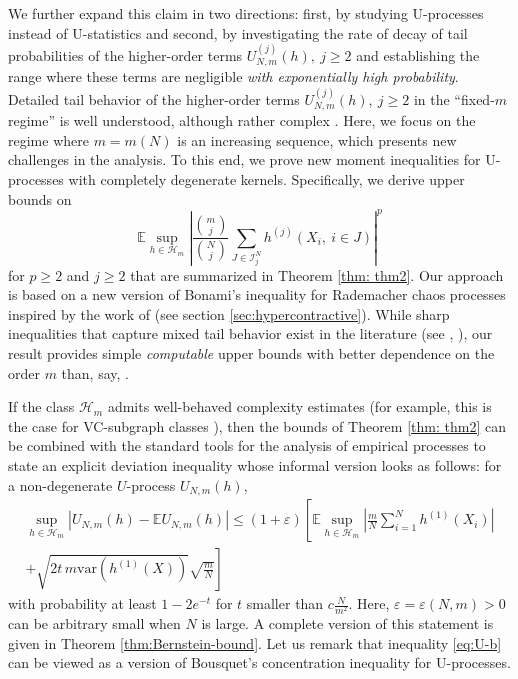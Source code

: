 \documentclass[12pt]{article}
\newcommand\var{\mathrm{var}}
\newcommand{\eps}{\varepsilon}
\def\l{\left}
\def\r{\right}
\newcommand{\m}{\mathcal}
\newcommand{\mb}{\mathbb}
\theoremstyle{thmstyletwo}%
\theoremstyle{thmstylethree}%
\begin{document}
We further expand this claim in two directions: first, by studying U-processes instead of U-statistics and second, by investigating the rate of decay of tail probabilities of the higher-order terms $U_{N,m}^{(j)}(h), \ j\geq 2$ and establishing the range where these terms are negligible \emph{with exponentially high probability}. 
Detailed tail behavior of the higher-order terms $U_{N,m}^{(j)}(h), \ j\geq 2$ in the ``fixed-$m$ regime'' is well understood, although rather complex \citep{adamczak2006moment,gine2000exponential}. Here, we focus on the regime where $m=m(N)$ is an increasing sequence, which presents new challenges in the analysis. 
To this end, we prove new moment inequalities for U-processes with completely degenerate kernels. Specifically, we derive upper bounds on 
\[
\mb E \sup_{h \in \mathcal{H}_m}\left\lvert \frac{{m \choose j}}{{N \choose j}} \sum_{J \in \mathcal{I}^N_j} h^{(j)}\l(X_i,\  i \in J\r)\right\rvert^p
\]
for \(p \ge 2\) and \(j \ge 2\) that are summarized in Theorem \ref{thm: thm2}. Our approach is based on a new version of Bonami's inequality for Rademacher chaos processes inspired by the work of \cite{dirksen2015tail} (see section \ref{sec:hypercontractive}). While sharp inequalities that capture mixed tail behavior exist in the literature (see \citep[Theorem 14]{boucheron2005moment}, \cite{adamczak2006moment}), our result provides simple \emph{computable} upper bounds with better dependence on the order $m$ than, say, \cite[Corollary 5]{boucheron2005moment}. 

If the class $\m H_m$ admits well-behaved complexity estimates (for example, this is the case for VC-subgraph classes \citep{wellner2013weak}), then the bounds of Theorem \ref{thm: thm2} can be combined with the standard tools for the analysis of empirical processes to state an explicit deviation inequality whose informal version looks as follows: for a non-degenerate $U$-process $U_{N,m}(h)$, 
\begin{multline}
\label{eq:U-b}
\sup_{h\in \m H_m} \l| U_{N,m}(h) - \mb E U_{N,m}(h) \r| 
    \leq (1+\eps)\l[\mb E\sup_{h\in \m H_m}\l|\frac{m}{N} \sum_{i=1}^N h^{(1)}\l(X_i\r)\r| \r.
    \\
    + \l. \sqrt{2t \,m\var\l(h^{(1)}(X)\r)}\sqrt{\frac{m}{N}} \r]
\end{multline}
with probability at least \(1-2e^{-t}\) for $t$ smaller than $c\frac{N}{m^2}$. 
Here, $\eps=\eps(N,m)>0$ can be arbitrary small when $N$ is large. 
A complete version of this statement is given in Theorem \ref{thm:Bernstein-bound}. Let us remark that inequality \eqref{eq:U-b} can be viewed as a version of Bousquet's concentration inequality \citep{bousquet2002bennett} for U-processes. 
\end{document}
